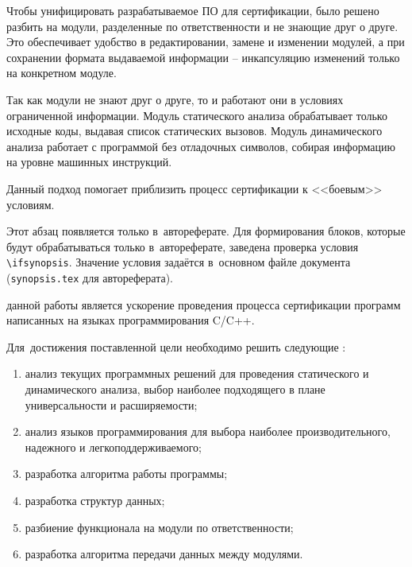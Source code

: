 Чтобы унифицировать разрабатываемое ПО для сертификации, было решено разбить {\ProgModule}
на модули, разделенные по ответственности и не знающие друг о друге. Это обеспечивает
удобство в редактировании, замене и изменении модулей, а при сохранении формата выдаваемой информации
 -- инкапсуляцию изменений только на конкретном модуле.

Так как модули не знают друг о друге, то и работают они в условиях ограниченной информации.
Модуль статического анализа обрабатывает только исходные коды, выдавая список статических
вызовов. Модуль динамического анализа работает с программой без отладочных символов,
собирая информацию на уровне машинных инструкций.

Данный подход помогает приблизить процесс сертификации к <<боевым>> условиям.

\ifsynopsis
Этот абзац появляется только в~автореферате.
Для формирования блоков, которые будут обрабатываться только в~автореферате,
заведена проверка условия \verb!\!\verb!ifsynopsis!.
Значение условия задаётся в~основном файле документа (\verb!synopsis.tex! для
автореферата).
\else
\fi


{\aim} данной работы является ускорение проведения процесса сертификации
программ написанных на языках программирования C/C++.

Для~достижения поставленной цели необходимо решить следующие {\tasks}:
\begin{enumerate}[label={\arabic*)}]
  \item анализ текущих программных решений для проведения 
        статического и динамического анализа, 
        выбор наиболее подходящего в плане универсальности 
        и расширяемости;
  \item анализ языков программирования для выбора наиболее производительного,
        надежного и легкоподдерживаемого;
  \item разработка алгоритма работы программы;
  \item разработка структур данных;
  \item разбиение функционала {\ProgModule} на модули по ответственности;
  \item разработка алгоритма передачи данных между модулями.
\end{enumerate}


